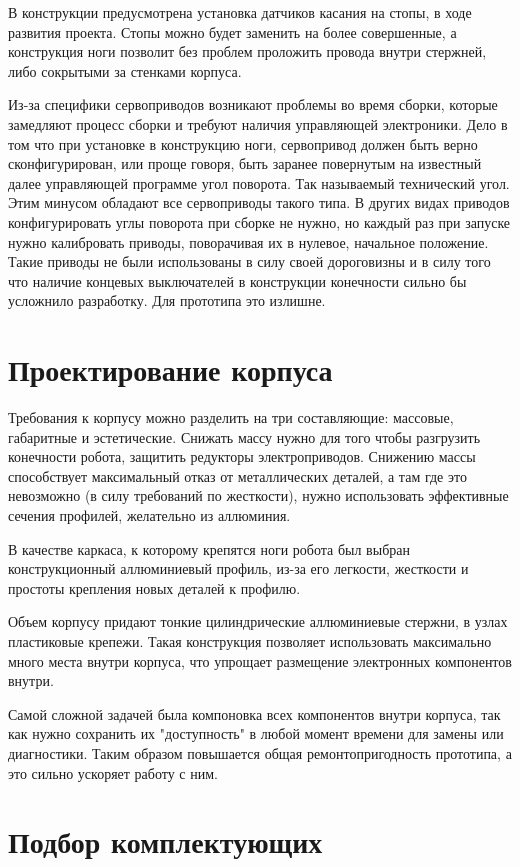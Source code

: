 В конструкции предусмотрена установка датчиков касания на стопы, в ходе развития проекта. Стопы можно будет заменить на более совершенные, а конструкция ноги позволит без проблем проложить провода внутри стержней, либо сокрытыми за стенками корпуса.

Из-за специфики сервоприводов возникают проблемы во время сборки, которые замедляют процесс сборки и требуют наличия управляющей электроники. Дело в том что при установке в конструкцию ноги, сервопривод должен быть верно сконфигурирован, или проще говоря, быть заранее повернутым на известный далее управляющей программе угол поворота. Так называемый технический угол. Этим минусом обладают все сервоприводы такого типа. В других видах приводов конфигурировать углы поворота при сборке не нужно, но каждый раз при запуске нужно калибровать приводы, поворачивая их в нулевое, начальное положение. Такие приводы не были использованы в силу своей дороговизны и в силу того что наличие концевых выключателей в конструкции конечности сильно бы усложнило разработку. Для прототипа это излишне.

\section{Проектирование корпуса}
Требования к корпусу можно разделить на три составляющие: массовые, габаритные и эстетические. Снижать массу нужно для того чтобы разгрузить конечности робота, защитить редукторы электроприводов. Снижению массы способствует максимальный отказ от металлических деталей, а там где это невозможно (в силу требований по жесткости), нужно использовать эффективные сечения профилей, желательно из аллюминия.

В качестве каркаса, к которому крепятся ноги робота был выбран конструкционный аллюминиевый профиль, из-за его легкости, жесткости и простоты крепления новых деталей к профилю.

Объем корпусу придают тонкие цилиндрические аллюминиевые стержни, в узлах пластиковые крепежи. Такая конструкция позволяет использовать максимально много места внутри корпуса, что упрощает размещение электронных компонентов внутри. 

Самой сложной задачей была компоновка всех компонентов внутри корпуса, так как нужно сохранить их "доступность" в любой момент времени для замены или диагностики. Таким образом повышается общая ремонтопригодность прототипа, а это сильно ускоряет работу с ним.

\section{Подбор комплектующих}
